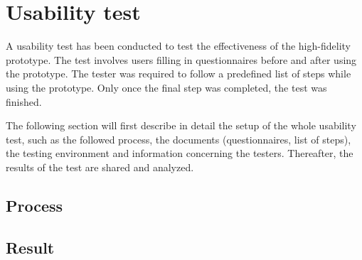 \section{Usability test} \label{usabilitytest}
	
A usability test has been conducted to test the effectiveness of the high-fidelity prototype. The test involves users filling in questionnaires before and after using the prototype. The tester was required to follow a predefined list of steps while using the prototype. Only once the final step was completed, the test was finished. 

The following section will first describe in detail the setup of the whole usability test, such as the followed process, the documents (questionnaires, list of steps), the testing environment and information concerning the testers. Thereafter, the results of the test are shared and analyzed.

    \subsection{Process}



    \subsection{Result}

    